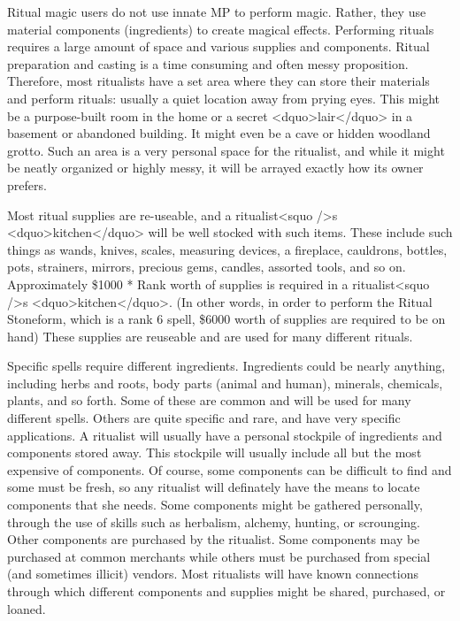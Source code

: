 Ritual magic users do not use innate MP to perform magic.  Rather,
they use material components (ingredients) to create magical effects.
Performing rituals requires a large amount of space and various
supplies and components. Ritual preparation and casting is a time
consuming and often messy proposition.  Therefore, most ritualists
have a set area where they can store their materials and perform
rituals: usually a quiet location away from prying eyes.  This might
be a purpose-built room in the home or a secret <dquo>lair</dquo> in a basement
or abandoned building.  It might even be a cave or hidden woodland
grotto.  Such an area is a very personal space for the ritualist, and
while it might be neatly organized or highly messy, it will be arrayed
exactly how its owner prefers.

Most ritual supplies are re-useable, and a ritualist<squo />s <dquo>kitchen</dquo>
will be well stocked with such items.  These include such things as
wands, knives, scales, measuring devices, a fireplace, cauldrons,
bottles, pots, strainers, mirrors, precious gems, candles, assorted
tools, and so on.  Approximately \$1000 * Rank worth of supplies is
required in a ritualist<squo />s <dquo>kitchen</dquo>.  (In other words, in order to
perform the Ritual Stoneform, which is a rank 6 spell, \$6000 worth of
supplies are required to be on hand) These supplies are reuseable and
are used for many different rituals.

Specific spells require different ingredients.  Ingredients could be
nearly anything, including herbs and roots, body parts (animal and
human), minerals, chemicals, plants, and so forth.  Some of these are
common and will be used for many different spells.  Others are quite
specific and rare, and have very specific applications.  A ritualist
will usually have a personal stockpile of ingredients and components
stored away.  This stockpile will usually include all but the most
expensive of components.  Of course, some components can be difficult
to find and some must be fresh, so any ritualist will definately have
the means to locate components that she needs.  Some components might
be gathered personally, through the use of skills such as herbalism,
alchemy, hunting, or scrounging.  Other components are purchased by
the ritualist.  Some components may be purchased at common merchants
while others must be purchased from special (and sometimes illicit)
vendors.  Most ritualists will have known connections through which
different components and supplies might be shared, purchased, or
loaned.

